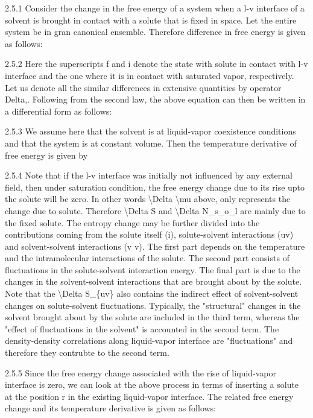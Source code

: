 \par 2.5.1 Consider the change in the free energy of a system when a l-v interface of a solvent is brought in contact with a solute that is fixed in space. Let the entire system be in gran canonical ensemble. Therefore difference in free energy is given as follows:
\par 2.5.2 Here the superscripts f and i denote the state with solute in contact with l-v interface and the one where it is in contact with saturated vapor, respectively. Let us denote all the similar differences in extensive quantities by operator Delta,. Following from the second law, the above equation can then be written in a differential form as follows:
\par 2.5.3 We assume here that the solvent is at liquid-vapor coexistence conditions and that the system is at constant volume. Then the temperature derivative of free energy is given by
\par 2.5.4 Note that if the l-v interface was initially not influenced by any external field, then under saturation condition, the free energy change due to its rise upto the solute will be zero. In other words \textbackslash Delta \textbackslash mu above, only represents the change due to solute. Therefore \textbackslash Delta S and \textbackslash Delta N\_s\_o\_l are mainly due to the fixed solute. The entropy change may be further divided into the contributions coming from the solute itself (i), solute-solvent interactions (uv) and solvent-solvent interactions (v v). The first part depends on the temperature and the intramolecular interactions of the solute. The second part consists of fluctuations in the solute-solvent interaction energy. The final part is due to the changes in the solvent-solvent interactions that are brought about by the solute. Note that the \textbackslash Delta S\_\{uv\} also contains the indirect effect of solvent-solvent changes on solute-solvent fluctuations. Typically, the "structural" changes in the solvent brought about by the solute are included in the third term, whereas the "effect of fluctuations in the solvent" is accounted in the second term. The density-density correlations along liquid-vapor interface are "fluctuations" and therefore they contrubte to the second term.
\par 2.5.5 Since the free energy change associated with the rise of liquid-vapor interface is zero, we can look at the above process in terms of inserting a solute at the position r in the existing liquid-vapor interface. The related free energy change and its temperature derivative is given as follows:
